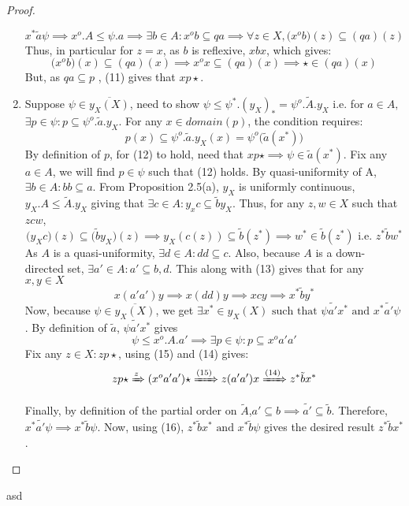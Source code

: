 \documentclass[18pt,a4paper]{article}
\theoremstyle{definition}
\begin{document}
\begin{proof}
\begin{enumerate}[label=(\alph*)]
		\begin{equation} x^* \tilde{a} \psi \implies x^o.A \leq \psi.a
		\implies \exists b\in A: x^ob \subseteq qa
		\implies \forall z \in X, \big(x^o b \big)(z) \subseteq (qa)(z)
	\end{equation}
	Thus, in particular for $z=x$, as $b$ is reflexive, $xbx$, which gives:
	\begin{equation} \big(x^o b \big)(x) \subseteq (qa)(x) \implies x^ox \subseteq (qa)(x) \implies \star \in (qa)(x) \end{equation}
	But, as $qa \subseteq p$ , (11) gives that $xp\star$.
\item Suppose $\psi \in \overline{y_X(X)}$, need to show $\psi \leq \psi^*.(y_X)_*=\psi^o.\tilde{A}.y_X$ i.e.
	for $a \in A,$ $\exists p \in \psi: p \subseteq \psi^o.\tilde{a}.y_X$. For any $x \in domain(p)$,
	the condition requires:
	\begin{equation}
		p(x) \subseteq  \psi^o.\tilde{a} .y_X(x)=\psi^o\big(\tilde{a} (x^*)\big)
	\end{equation}
	By definition of $p$, for (12) to hold, need that $xp\star \implies \psi \in \tilde{a}(x^*) $. Fix
	any $a\in A$, we will find $p \in \psi$ such that (12) holds. By quasi-uniformity of A,
	$\exists b \in A: bb \subseteq a$. From Proposition 2.5(a), $y_X$ is uniformly continuous,
	$y_X.A \leq \tilde{A}.y_X $ giving that $\exists c \in A: y_xc \subseteq \tilde{b}y_X $. Thus, for
	any $z,w\in X$ such that $z c w$,
	\begin{equation} \big(y_X c \big)(z) \subseteq \big(\tilde{b} y_X\big)(z) \implies
	y_X(c(z)) \subseteq \tilde{b}(z^*) \implies w^* \in \tilde{b}(z^*) \text{ i.e. } z^* \tilde{b} w^*
	\end{equation}
	As $A$ is a quasi-uniformity, $\exists d\in A: dd \subseteq c$. Also, because $A$ is a down-
	directed set, $\exists a' \in A: a' \subseteq b,d $. This along with (13) gives that
	for any $x,y \in X$
	\begin{equation} x(a'a')y \implies x(dd)y \implies xcy \implies x^* \tilde{b} y^* \end{equation}
	Now, because $\psi \in \overline{y_X(X)}$, we get
	$\exists x^* \in y_X(X) \text{ such that } \psi \tilde{a'}x^* \text{ and } x^* \tilde{a'} \psi $.
	By definition of $\tilde{a}$, $\psi \tilde{a'}x^*$ gives
	\begin{equation} \psi \leq x^o.A.a' \implies \exists p \in \psi: p \subseteq x^o a'a' \end{equation}
	Fix any $z \in X : zp \star$, using (15) and (14) gives:
	\begin{equation} zp \star \xRightarrow z(x^o a'a') \star \xRightarrow{(15)} z(a'a')x
	 \xRightarrow{(14)} z^* \tilde{b}x^*   \end{equation}

	 Finally, by definition of the partial order on $\tilde{A}$,$a' \subseteq b \implies \tilde{a'}
	 \subseteq \tilde{b} $. Therefore,  $x^* \tilde{a'}\psi \implies x^* \tilde{b}\psi$.
	 Now, using (16), $z^* \tilde{b}x^* \text{ and } x^*\tilde{b}\psi  $ gives the desired result
	 $z^* \tilde{b} x^* $.
\end{enumerate}
\end{proof}






\newpage
asd
\end{document}
